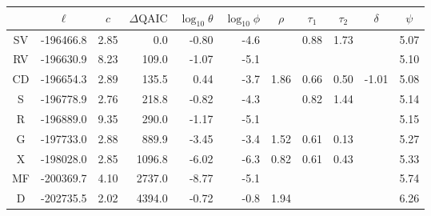 \begin{tabular}{crrrrrrrrrr}
  \hline
 & \multicolumn{1}{c}{$\ell$} & \multicolumn{1}{c}{$\hat{c}$} & \multicolumn{1}{c}{$\Delta\!\mathrm{QAIC}$} & \multicolumn{1}{c}{$\log_{10}{\theta}$} & \multicolumn{1}{c}{$\log_{10}{\phi}$} & \multicolumn{1}{c}{$\rho$} & \multicolumn{1}{c}{$\tau_1$} & \multicolumn{1}{c}{$\tau_2$} & \multicolumn{1}{c}{$\delta$} & \multicolumn{1}{c}{$\psi$} \\ 
  \hline
SV & -196466.8 & 2.85 & 0.0 & -0.80 & -4.6 &  & 0.88 & 1.73 &  & 5.07 \\ 
  RV & -196630.9 & 8.23 & 109.0 & -1.07 & -5.1 &  &  &  &  & 5.10 \\ 
  CD & -196654.3 & 2.89 & 135.5 & 0.44 & -3.7 & 1.86 & 0.66 & 0.50 & -1.01 & 5.08 \\ 
  S & -196778.9 & 2.76 & 218.8 & -0.82 & -4.3 &  & 0.82 & 1.44 &  & 5.14 \\ 
  R & -196889.0 & 9.35 & 290.0 & -1.17 & -5.1 &  &  &  &  & 5.15 \\ 
  G & -197733.0 & 2.88 & 889.9 & -3.45 & -3.4 & 1.52 & 0.61 & 0.13 &  & 5.27 \\ 
  X & -198028.0 & 2.85 & 1096.8 & -6.02 & -6.3 & 0.82 & 0.61 & 0.43 &  & 5.33 \\ 
  MF & -200369.7 & 4.10 & 2737.0 & -8.77 & -5.1 &  &  &  &  & 5.74 \\ 
  D & -202735.5 & 2.02 & 4394.0 & -0.72 & -0.8 & 1.94 &  &  &  & 6.26 \\ 
   \hline
\end{tabular}
